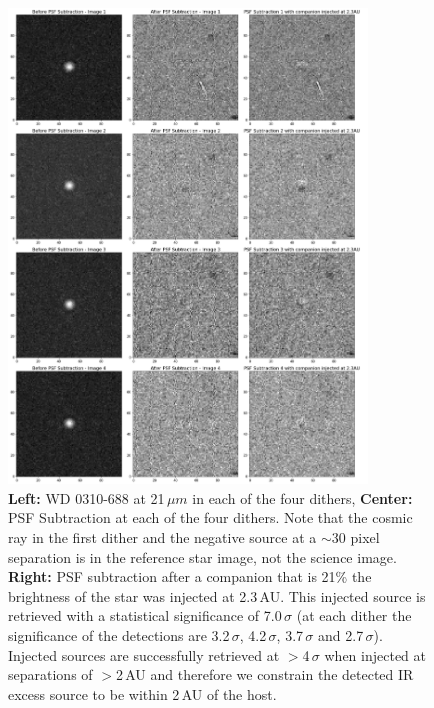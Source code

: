 \documentclass[twocolumn]{aastex631}
\begin{document}
\begin{figure}
\centering
\includegraphics[width=0.85\textwidth]{Figures/PSFsubtraction.png}
\caption{{\bf Left:} WD 0310-688 at 21\,$\mu m$ in each of the four dithers, {\bf Center:} PSF Subtraction at each of the four dithers. Note that the cosmic ray in the first dither and the negative source at a $\sim$30 pixel separation is in the reference star image, not the science image. {\bf Right:} PSF subtraction after a companion that is 21\% the brightness of the star was injected at 2.3\,AU. This injected source is retrieved with a statistical significance of 7.0\,$\sigma$ (at each dither the significance of the detections are 3.2\,$\sigma$, 4.2\,$\sigma$, 3.7\,$\sigma$ and 2.7\,$\sigma$). Injected sources are successfully retrieved at $>$4\,$\sigma$ when injected at separations of $>$2\,AU and therefore we constrain the detected IR excess source to be within 2\,AU of the host.}
\label{PSF}
\end{figure}
\end{document}

